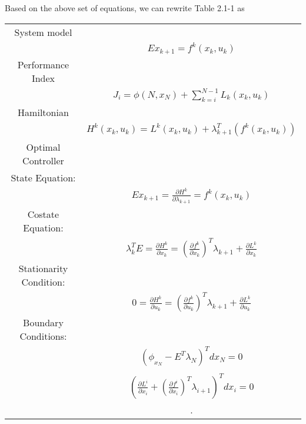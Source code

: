 \documentclass{article}
\begin{document}
  \newpage
  Based on the above set of equations, we can rewrite Table 2.1-1 as
  \begin{center}
    \begin{tabular}{ |c|c| } 
      \hline
      System model &  \\ 
	           & $Ex_{k+1}=f^k(x_k,u_k)$ \\
      Performance Index & \\ 
	    & $J_i=\phi(N,x_N)+\sum_{k=i}^{N-1}L_k(x_k,u_k)$ \\
      Hamiltonian & \\ 
	    & $H^k(x_k, u_k)=L^k(x_k, u_k)+\lambda_{k+1}^T(f^k(x_k,u_k))$ \\
      Optimal Controller & \\
      State Equation: & \\
	    & $Ex_{k+1}=\frac{\partial H^k}{\partial \lambda_{k+1}}=f^k(x_k,u_k)$ \\
      Costate Equation: & \\
	    & $\lambda_k^TE=\frac{\partial H^k}{\partial x_k}=(\frac{\partial f^k}{\partial x_k})^T\lambda_{k+1}+\frac{\partial L^k}{\partial x_k}$ \\
      Stationarity Condition: & \\
	    & $0=\frac{\partial H^k}{\partial u_k}=(\frac{\partial f^k}{\partial u_k})^T\lambda_{k+1}+\frac{\partial L^k}{\partial u_k}$ \\
      Boundary Conditions: & \\
	    & $(\phi_{x_N}-E^T\lambda_N)^Tdx_N=0$ \\
	    & \\
	    & $(\frac{\partial L^i}{\partial x_i}+(\frac{\partial f^i}{\partial x_i})^T\lambda_{i+1})^Tdx_i=0$ \\
	    & . \\
      \hline
     \end{tabular}
  \end{center}
  \newpage
\end{document}
